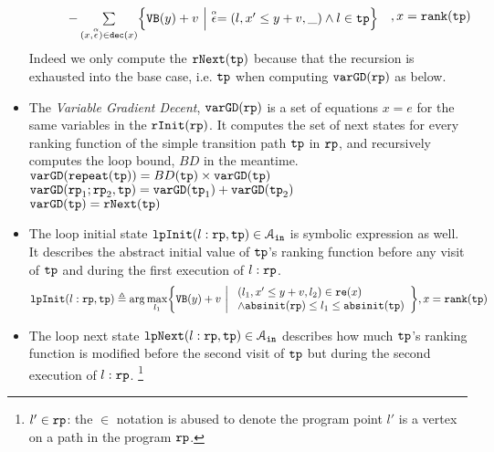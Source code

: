 \begin{defn}
\begin{itemize}
\[\begin{array}{l}
\begin{array}{l}
       \\ \qquad 
       - \sum\limits_{(x, \absevent) \in \dec(x) }\left\{ 
         \varinvar(y) + v ~\middle\vert~ \absevent = (l, x' \leq y + v, \_) \land l \in \tpath 
         \right\}
       \end{array}
     \end{array}
     , x = \locbound(\tpath)
   \]
   Indeed we only compute the $\mathtt{rNext}(\mathtt{tp})$ because that the recursion is exhausted into the base case, i.e. $\mathtt{tp}$ when computing $\mathtt{varGD}(\mathtt{rp})$ as below.
   \item  The \emph{Variable Gradient Decent}, 
   $\mathtt{varGD}(\mathtt{rp})$
   is a set of equations $x = e$ for the same variables in the $\mathtt{rInit}(\mathtt{rp})$.
   It computes the set of next states for every ranking function of the simple transition path $\mathtt{tp}$ in $\mathtt{rp}$,
   and recursively computes the loop bound, $BD$ in the meantime.
   \\
   {$\mathtt{varGD}(\mathtt{repeat}(\mathtt{tp})) =  BD(\mathtt{tp}) \times {\ensuremath{\mathtt{varGD}}(\ensuremath{\mathtt{tp}})}$}
   \\
   $\mathtt{varGD}(\mathtt{rp}_1;\mathtt{rp}_2, \mathtt{tp}) =  \mathtt{varGD}(\mathtt{tp}_1)+ \mathtt{varGD}(\mathtt{tp}_2)$
   \\
   $\mathtt{varGD}(\mathtt{tp}) =  \mathtt{rNext}(\mathtt{tp})$   
%
   \item 
The loop initial state 
$\mathtt{lpInit}(l: \mathtt{rp}, \mathtt{tp}) \in \mathcal{A}_{\mathtt{in}}$ is symbolic expression as well. 
It describes the abstract initial value of $\mathtt{tp}$'s ranking function before
any visit of $\mathtt{tp}$ and during the first execution of $l: \mathtt{rp}$.
\[
  \lpinit(l: \rprog, \tpath) \triangleq 
  \arg\max_{l_1}\left\{
       \varinvar(y) + v ~\middle\vert~ 
       \begin{array}{l} 
         (l_1, x' \leq y + v, l_2) \in \reset(x) 
         \\
         \land \absinit(\rprog) \leq l_1 \leq \absinit(\tpath)
       \end{array}
     \right\}
    , x = \locbound(\tpath)
  \]
\item
The loop next state 
$\mathtt{lpNext}(l: \mathtt{rp}, \mathtt{tp}) \in \mathcal{A}_{\mathtt{in}}$ 
describes how much $\mathtt{tp}$'s ranking function
is modified before
the second visit of $\mathtt{tp}$ but during the second execution of $l: \mathtt{rp}$.
\footnote{$l' \in \mathtt{rp}$: the $\in$ notation is abused to denote
the program point $l'$ is a vertex on a path in the program $\mathtt{rp}$.}

\end{itemize}
\end{defn}
